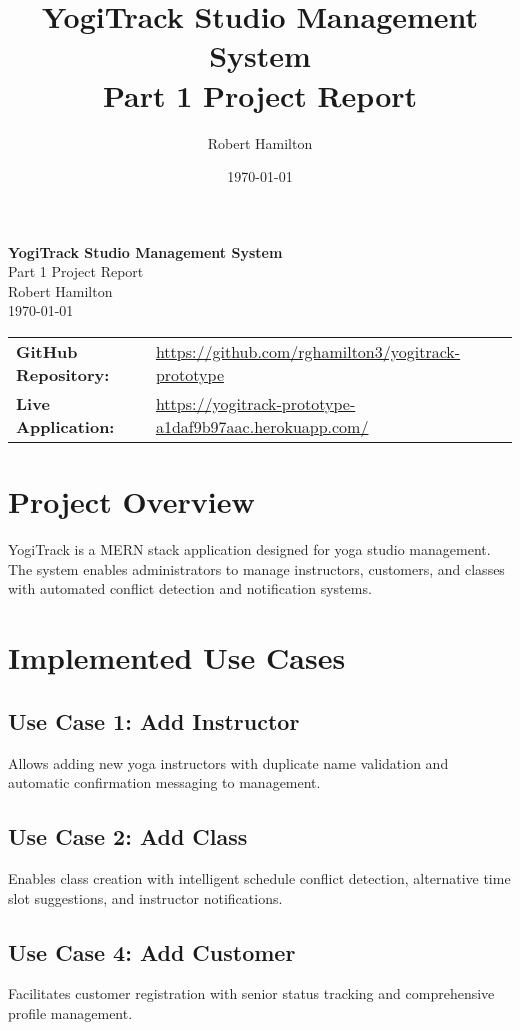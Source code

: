 \documentclass[11pt,a4paper]{article}
\title{YogiTrack Studio Management System\\Part 1 Project Report}
\author{Robert Hamilton}
\date{\today}
\begin{document}
\begin{titlepage}
\centering
\vspace*{2cm}

{\Huge\bfseries YogiTrack Studio Management System}\\[0.5cm]
{\Large Part 1 Project Report}\\[2cm]

{\large Robert Hamilton}\\[1cm]

{\large \today}\\[3cm]

\begin{tabular}{ll}
\textbf{GitHub Repository:} & \url{https://github.com/rghamilton3/yogitrack-prototype} \\[0.5cm]
\textbf{Live Application:} & \url{https://yogitrack-prototype-a1daf9b97aac.herokuapp.com/}
\end{tabular}

\vfill
\end{titlepage}

\section{Project Overview}

YogiTrack is a MERN stack application designed for yoga studio management. The system enables administrators to manage instructors, customers, and classes with automated conflict detection and notification systems.

\section{Implemented Use Cases}

\subsection{Use Case 1: Add Instructor}
Allows adding new yoga instructors with duplicate name validation and automatic confirmation messaging to management.

\subsection{Use Case 2: Add Class}
Enables class creation with intelligent schedule conflict detection, alternative time slot suggestions, and instructor notifications.

\subsection{Use Case 4: Add Customer}
Facilitates customer registration with senior status tracking and comprehensive profile management.
\end{document}
